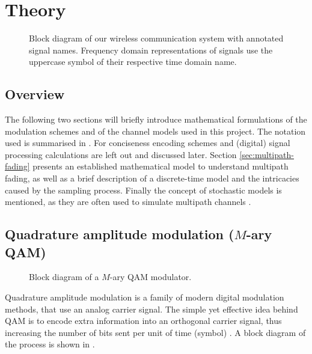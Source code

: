 
\chapter{Theory}

\begin{figure}
	\centering
	\resizebox{.9\linewidth}{!}{
		
	}
	\caption{
		Block diagram of our wireless communication system with annotated signal names. Frequency domain representations of signals use the uppercase symbol of their respective time domain name.
		\label{fig:notation}
	}
\end{figure}

\section{Overview}

The following two sections will briefly introduce mathematical formulations of the modulation schemes and of the channel models used in this project. The notation used is summarised in . For conciseness encoding schemes and (digital) signal processing calculations are left out and discussed later.  Section \ref{sec:multipath-fading} presents an established mathematical model to understand multipath fading, as well as a brief description of a discrete-time model and the intricacies caused by the sampling process. Finally the concept of stochastic models is mentioned, as they are often used to simulate multipath channels \cite{Messier,Mathis}.


\section{Quadrature amplitude modulation (\(M\)-ary QAM)}

\begin{figure}
	\centering
	\resizebox{\linewidth}{!}{
		
	}
	\caption{
		Block diagram of a \(M\)-ary QAM modulator.
		\label{fig:quadrature-modulation}
	}
\end{figure}

Quadrature amplitude modulation is a family of modern digital modulation methods, that use an analog carrier signal. The simple yet effective idea behind QAM is to encode extra information into an orthogonal carrier signal, thus increasing the number of bits sent per unit of time (symbol) \cite{Gallager,Kneubuehler,Mathis,Hsu}. A block diagram of the process is shown in .


